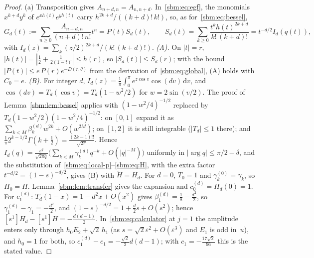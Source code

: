 \documentclass[11pt,letterpaper]{article}
\numberwithin{equation}{section}
\theoremstyle{remark}\newtheorem{remark}[theorem]{Remark}
\newcommand{\dd}{\,\mathrm d}
\begin{document}
\begin{proof}
(a) Transposition gives $A_{n+d,n}=A_{n,n+d}$. In~\eqref{sbm:eq:egf}, the
monomials $x^{k+d}y^k$ of $e^{xh(t)}e^{yh(t)}$ carry
$h^{2k+d}/((k+d)!\,k!)$, so, as for~\eqref{sbm:eq:bessel},
\[
 G_d(t):=\sum_{n\ge0}\frac{A_{n+d,n}}{(n+d)!\,n!}t^n=P(t)S_d(t),\qquad
 S_d(t)=\sum_{k\ge0}\frac{t^kh(t)^{2k+d}}{k!\,(k+d)!}=t^{-d/2}I_d(q(t)),
\]
with $I_d(z)=\sum_k(z/2)^{2k+d}/(k!\,(k+d)!)$. \emph{(A).} On $|t|=r$,
$|h(t)|=|\frac12+\frac1{2(1-t)}|\le h(r)$, so $|S_d(t)|\le S_d(r)$; with the
bound $|P(t)|\le e\,P(r)e^{-D(r,\theta)}$ from the derivation
of~\eqref{sbm:eq:global}, (A) holds with $C_0=e$. \emph{(B).} For integer $d$,
$I_d(z)=\frac1\pi\int_0^\pi e^{z\cos v}\cos(dv)\dd v$, and
$\cos(dv)=T_d(\cos v)=T_d(1-w^2/2)$ for $w=2\sin(v/2)$. The proof of
Lemma~\ref{sbm:lem:bessel} applies with $(1-w^2/4)^{-1/2}$ replaced by
$T_d(1-w^2/2)(1-w^2/4)^{-1/2}$: on $[0,1]$ expand it as
$\sum_{k<M}\beta^{(d)}_kw^{2k}+O(w^{2M})$; on $[1,2]$ it is still integrable
($|T_d|\le1$ there); and
$\frac1\pi2^{k-1/2}\Gamma(k+\frac12)=\frac{(2k-1)!!}{\sqrt{2\pi}}$. Hence
$I_d(q)=\frac{e^q}{\sqrt{2\pi q}}\bigl(\sum_{k<M}\gamma^{(d)}_kq^{-k}+O(|q|^{-M})\bigr)$
uniformly in $|\arg q|\le\pi/2-\delta$, and the substitution
of~\eqref{sbm:eq:local-p}--\eqref{sbm:eq:H}, with the extra factor
$t^{-d/2}=(1-s)^{-d/2}$, gives (B) with $\widetilde H=H_d$. For $d=0$,
$T_0=1$ and $\gamma^{(0)}_k=\gamma_k$, so $H_0=H$.
Lemma~\ref{sbm:lem:transfer} gives the expansion and $c^{(d)}_0=H_d(0)=1$.
For $c^{(d)}_1$: $T_d(1-x)=1-d^2x+O(x^2)$ gives
$\beta^{(d)}_1=\frac18-\frac{d^2}2$, so $\gamma^{(d)}_1-\gamma_1=-\frac{d^2}2$,
and $(1-s)^{-d/2}=1+\frac d2s+O(s^2)$; hence
$[s^1]H_d-[s^1]H=-\frac{d(d-1)}2$. In~\eqref{sbm:eq:calculator} at $j=1$ the
amplitude enters only through $h_0E_2+\sqrt2\,h_1$ (as
$s=\sqrt2\varepsilon^2+O(\varepsilon^3)$ and $E_1$ is odd in~$u$), and
$h_0=1$ for both, so $c^{(d)}_1-c_1=-\frac{\sqrt2}2d(d-1)$; with
$c_1=-\frac{17\sqrt2}{96}$ this is the stated value.


\end{proof}
\end{document}
